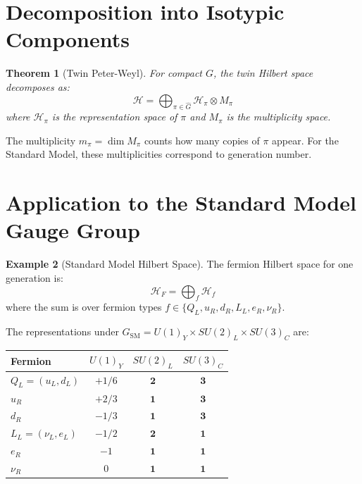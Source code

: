 \documentclass[11pt,a4paper,openright]{book}
\theoremstyle{plain}
\newtheorem{theorem}{Theorem}[chapter]
\theoremstyle{definition}
\newtheorem{example}[theorem]{Example}
\newcommand{\Hil}{\mathcal{H}}
\newcommand{\SM}{\mathrm{SM}}
\begin{document}
\section{Decomposition into Isotypic Components}

\begin{theorem}[Twin Peter-Weyl]
For compact $G$, the twin Hilbert space decomposes as:
\begin{equation}
\Hil = \bigoplus_{\pi \in \hat{G}} \Hil_\pi \otimes M_\pi
\end{equation}
where $\Hil_\pi$ is the representation space of $\pi$ and $M_\pi$ is the multiplicity space.
\end{theorem}

The multiplicity $m_\pi = \dim M_\pi$ counts how many copies of $\pi$ appear. For the Standard Model, these multiplicities correspond to generation number.

\section{Application to the Standard Model Gauge Group}

\begin{example}[Standard Model Hilbert Space]
The fermion Hilbert space for one generation is:
\begin{equation}
\Hil_F = \bigoplus_f \Hil_f
\end{equation}
where the sum is over fermion types $f \in \{Q_L, u_R, d_R, L_L, e_R, \nu_R\}$.

The representations under $G_{\SM} = U(1)_Y \times SU(2)_L \times SU(3)_C$ are:

\begin{center}
\begin{tabular}{lccc}
\toprule
Fermion & $U(1)_Y$ & $SU(2)_L$ & $SU(3)_C$ \\
\midrule
$Q_L = (u_L, d_L)$ & $+1/6$ & $\mathbf{2}$ & $\mathbf{3}$ \\
$u_R$ & $+2/3$ & $\mathbf{1}$ & $\mathbf{3}$ \\
$d_R$ & $-1/3$ & $\mathbf{1}$ & $\mathbf{3}$ \\
$L_L = (\nu_L, e_L)$ & $-1/2$ & $\mathbf{2}$ & $\mathbf{1}$ \\
$e_R$ & $-1$ & $\mathbf{1}$ & $\mathbf{1}$ \\
$\nu_R$ & $0$ & $\mathbf{1}$ & $\mathbf{1}$ \\
\bottomrule
\end{tabular}
\end{center}
\end{example}
\end{document}
